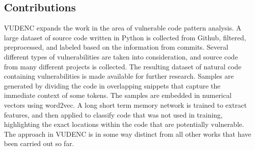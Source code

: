 \documentclass[
	a4paper,
	pagesize,
	pdftex,
	12pt,
	twoside, %
	BCOR=5mm, %
	ngerman,
	fleqn,
	final,
	]{scrartcl}
\begin{document}
\subsection{Contributions}

VUDENC expands the work in the area of vulnerable code pattern analysis. A large dataset of source code written in Python is collected from Github, filtered, preprocessed, and labeled based on the information from commits. Several different types of vulnerabilities are taken into consideration, and source code from many different projects is collected. The resulting dataset of natural code containing vulnerabilities is made available for further research. Samples are generated by dividing the code in overlapping snippets that capture the immediate context of some tokens. The samples are embedded in numerical vectors using word2vec. A long short term memory network is trained to extract features, and then applied to classify code that was not used in training, highlighting the exact locations within the code that are potentially vulnerable. The approach in VUDENC is in some way distinct from all other works that have been carried out so far.\\
\end{document}
